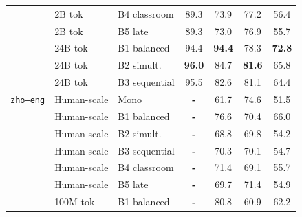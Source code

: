 \documentclass[11pt]{article}
\begin{document}
\begin{table}[ht!]
\begin{minipage}[t]{0.49\linewidth}
\begin{tabular}{ll l cc cc}
 & 2B tok & B4 classroom & \cellcolor[rgb]{0.783,1.000,0.783} 89.3 & \cellcolor[rgb]{0.870,1.000,0.870} 73.9 & \cellcolor[rgb]{0.807,1.000,0.807} 77.2 & \cellcolor[rgb]{0.947,1.000,0.947} 56.4 \\
 & 2B tok & B5 late & \cellcolor[rgb]{0.783,1.000,0.783} 89.3 & \cellcolor[rgb]{0.875,1.000,0.875} 73.0 & \cellcolor[rgb]{0.809,1.000,0.809} 76.9 & \cellcolor[rgb]{0.953,1.000,0.953} 55.7 \\
\addlinespace[1.5pt]
 & 24B tok & B1 balanced & \cellcolor[rgb]{0.754,1.000,0.754} 94.4 & \cellcolor[rgb]{0.758,1.000,0.758} \textbf{94.4} & \cellcolor[rgb]{0.799,1.000,0.799} 78.3 & \cellcolor[rgb]{0.812,1.000,0.812} \textbf{72.8} \\
 & 24B tok & B2 simult. & \cellcolor[rgb]{0.745,1.000,0.745} \textbf{96.0} & \cellcolor[rgb]{0.811,1.000,0.811} 84.7 & \cellcolor[rgb]{0.775,1.000,0.775} \textbf{81.6} & \cellcolor[rgb]{0.870,1.000,0.870} 65.8 \\
 & 24B tok & B3 sequential & \cellcolor[rgb]{0.748,1.000,0.748} 95.5 & \cellcolor[rgb]{0.822,1.000,0.822} 82.6 & \cellcolor[rgb]{0.779,1.000,0.779} 81.1 & \cellcolor[rgb]{0.881,1.000,0.881} 64.4 \\
\midrule
\texttt{zho--eng} & Human-scale & Mono & \textbf{-} & \cellcolor[rgb]{0.936,1.000,0.936} 61.7 & \cellcolor[rgb]{0.825,1.000,0.825} 74.6 & \cellcolor[rgb]{0.988,1.000,0.988} 51.5 \\
 & Human-scale & B1 balanced & \textbf{-} & \cellcolor[rgb]{0.855,1.000,0.855} 76.6 & \cellcolor[rgb]{0.855,1.000,0.855} 70.4 & \cellcolor[rgb]{0.868,1.000,0.868} 66.0 \\
 & Human-scale & B2 simult. & \textbf{-} & \cellcolor[rgb]{0.897,1.000,0.897} 68.8 & \cellcolor[rgb]{0.859,1.000,0.859} 69.8 & \cellcolor[rgb]{0.965,1.000,0.965} 54.2 \\
 & Human-scale & B3 sequential & \textbf{-} & \cellcolor[rgb]{0.889,1.000,0.889} 70.3 & \cellcolor[rgb]{0.857,1.000,0.857} 70.1 & \cellcolor[rgb]{0.961,1.000,0.961} 54.7 \\
 & Human-scale & B4 classroom & \textbf{-} & \cellcolor[rgb]{0.883,1.000,0.883} 71.4 & \cellcolor[rgb]{0.864,1.000,0.864} 69.1 & \cellcolor[rgb]{0.953,1.000,0.953} 55.7 \\
 & Human-scale & B5 late & \textbf{-} & \cellcolor[rgb]{0.893,1.000,0.893} 69.7 & \cellcolor[rgb]{0.848,1.000,0.848} 71.4 & \cellcolor[rgb]{0.960,1.000,0.960} 54.9 \\
\addlinespace[1.5pt]
 & 100M tok & B1 balanced & \textbf{-} & \cellcolor[rgb]{0.832,1.000,0.832} 80.8 & \cellcolor[rgb]{0.923,1.000,0.923} 60.9 & \cellcolor[rgb]{0.900,1.000,0.900} 62.2 \\

\end{tabular}
\end{minipage}
\end{table}
\end{document}
